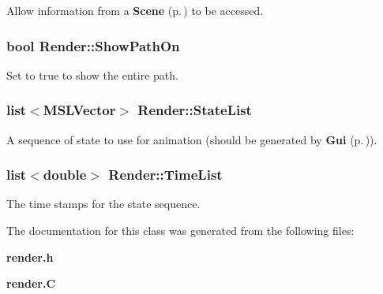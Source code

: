 Allow information from a {\bf Scene} {\rm (p.\,\pageref{classScene})} to be accessed.

\subsubsection{\setlength{\rightskip}{0pt plus 5cm}bool Render::Show\-Path\-On}\label{classRender_m20}


Set to true to show the entire path.

\subsubsection{\setlength{\rightskip}{0pt plus 5cm}list$<${\bf MSLVector}$>$ Render::State\-List\hspace{0.3cm}{\tt  [protected]}}\label{classRender_n1}


A sequence of state to use for animation (should be generated by {\bf Gui} {\rm (p.\,\pageref{classGui})}).

\subsubsection{\setlength{\rightskip}{0pt plus 5cm}list$<$double$>$ Render::Time\-List\hspace{0.3cm}{\tt  [protected]}}\label{classRender_n2}


The time stamps for the state sequence.



The documentation for this class was generated from the following files:\begin{CompactItemize}
\item 
{\bf render.h}\item 
{\bf render.C}\end{CompactItemize}
